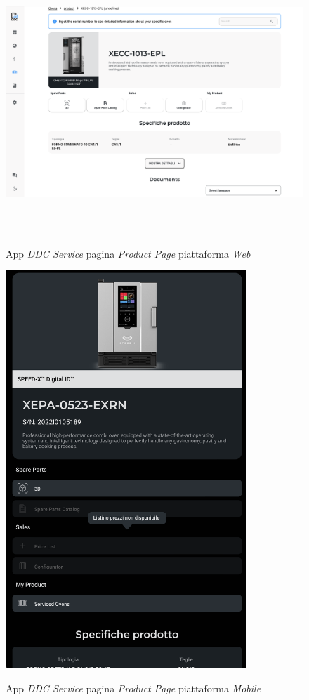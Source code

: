 \begin{figure}[H]
    \centering
    \includegraphics[alt={Screenshot della pagina "Product Page" su piattaforma web}, height=10cm]{img/ProductPageWeb}
    \caption{App \textit{DDC Service} pagina \textit{Product Page} piattaforma \textit{Web}}
    \label{fig:productpageweb}
\end{figure}

\begin{figure}[H]
    \centering
    \includegraphics[alt={Screenshot della pagina "Product Page" su piattaforma mobile}, height=15cm]{img/ProductPageMobile}
    \caption{App \textit{DDC Service} pagina \textit{Product Page} piattaforma \textit{Mobile}}
    \label{fig:productpagemobile}
\end{figure}

